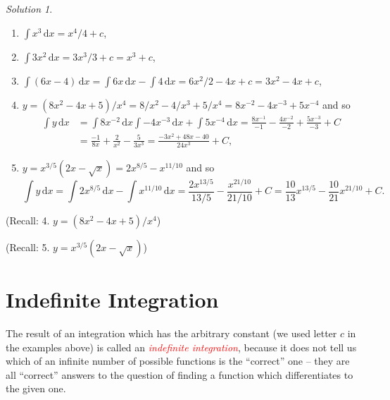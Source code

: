 \documentclass[
  11pt,
  oneside]{book}
\providecommand{\tightlist}{%
  \setlength{\itemsep}{0pt}\setlength{\parskip}{0pt}}
\newcommand{\slide}{}
\theoremstyle{definition}
\theoremstyle{definition}
\theoremstyle{definition}
\theoremstyle{definition}
\theoremstyle{remark}
\newtheorem*{solution}{Solution}
\begin{document}
\begin{solution}
\leavevmode

\begin{enumerate}
\def\labelenumi{\arabic{enumi}.}
\tightlist
\item
  \(\displaystyle\int x^3 \,\mathrm{d}x = x^4/4+c\),
\item
  \(\displaystyle\int 3x^2 \,\mathrm{d}x = 3x^3/3+c = x^3+c\),
\item
  \(\displaystyle\int(6x-4)\,\mathrm{d}x = \displaystyle\int 6x \,\mathrm{d}x - \displaystyle\int 4\,\mathrm{d}x = 6x^2/2-4x+c = 3x^2-4x+c\),
\item
  \(y=(8x^2-4x+5)/x^4 = 8/x^2-4/x^3+5/x^4 = 8x^{-2}-4x^{-3}+5x^{-4}\) and so
  \begin{align*}
  \int y \,\mathrm{d}x& = \int 8x^{-2}\,\mathrm{d}x\int -4x^{-3}\,\mathrm{d}x+\int5x^{-4}\,\mathrm{d}x = \frac{8x^{-1}}{-1}-\frac{4x^{-2}}{-2}+\frac{5x^{-3}}{-3}+C\\
  &=\frac{-1}{8x}+\frac{2}{x^2}-\frac{5}{3x^3} = \frac{-3x^2+48x-40}{24x^3} + C,
  \end{align*}
\item
  \(y = x^{3/5}(2x-\sqrt{x}) = 2x^{8/5}-x^{11/10}\) and so
  \[
  \int y \,\mathrm{d}x = \int 2x^{8/5}\,\mathrm{d}x-\int x^{11/10}\,\mathrm{d}x = \frac{2x^{13/5}}{13/5} - \frac{x^{21/10}}{21/10}+C = \frac{10}{13}x^{13/5}-\frac{10}{21}x^{21/10} + C.
  \]
\end{enumerate}

\end{solution}

\begin{slidesonly}

\slide

(Recall: 4. \(y=(8x^2-4x+5)/x^4\))

\slide

(Recall: 5. \(y=x^{3/5}(2x-\sqrt{x})\))
\slide

\end{slidesonly}

\section{Indefinite Integration}\label{indefinite-integration}

The result of an integration which has the arbitrary constant (we used letter \(c\) in the examples above) is called an \textcolor{red}{\em indefinite integration}, because it does not tell us which of an infinite number of possible functions is the ``correct'' one -- they are all ``correct'' answers to the question
of finding a function which differentiates to the given one.
\end{document}
